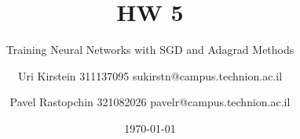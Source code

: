 \documentclass[12pt]{scrartcl}
\begin{document}

\titlehead{CS department, Technion}
\subject{Introduction to Optimization and Deep Learning 236330}
\title{HW 5}
\subtitle{Training Neural Networks with SGD and Adagrad Methods}
\author{Uri Kirstein 311137095 \hfill sukirstn@campus.technion.ac.il\and Pavel Rastopchin 321082026 pavelr@campus.technion.ac.il}
\date{\today}
\maketitle

\end{document}
